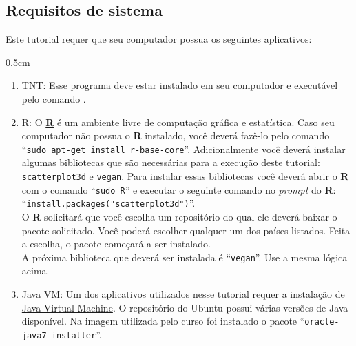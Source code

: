 \newpage
\pagestyle{fancy} %
\begin{refsection}
\renewcommand*{\finalnamedelim}{\addspace\&\space}%


\section{Requisitos de sistema}\label{tut3:require}
Este tutorial requer que seu computador possua os seguintes aplicativos:

\begin {myindentpar}{0.5cm}
\begin{enumerate}[\itshape i.]
	\item{TNT:}\label{tut3:require:tnt} Esse programa deve estar instalado em seu computador e executável pelo comando .

	\item{R:}\label{tut3:require:R} O \textbf{\href{http://www.r-project.org/}{R}} é um ambiente livre de computação gráfica e estatística. Caso seu computador não possua o \textbf{R} instalado, você deverá fazê-lo pelo comando ``\texttt{sudo apt-get install r-base-core}''. Adicionalmente você deverá instalar algumas bibliotecas que são necessárias para a execução deste tutorial: \texttt{scatterplot3d} e \texttt{vegan}. Para instalar essas bibliotecas você deverá abrir o \textbf{R} com o comando ``\texttt{sudo R}'' e executar o seguinte comando no \textit{prompt} do \textbf{R}: ``\texttt{install.packages("scatterplot3d")}''.\\
	O \textbf{R} solicitará que você escolha um repositório do qual ele deverá baixar o pacote solicitado. Você poderá escolher qualquer um dos países listados. Feita a escolha, o pacote começará a ser instalado.\\
	A próxima biblioteca que deverá ser instalada é ``\texttt{vegan}''. Use a mesma lógica acima.\\

	\item{Java VM:}\label{tut3:require:Java} Um dos aplicativos utilizados nesse tutorial requer a instalação de \href{http://www.java.com/pt_BR/download/}{Java Virtual Machine}. O repositório do Ubuntu possui várias versões de Java disponível. Na imagem utilizada pelo curso foi instalado o pacote ``\texttt{oracle-java7-installer}''.\\


\end{enumerate}
\end{myindentpar}
\end{refsection}
